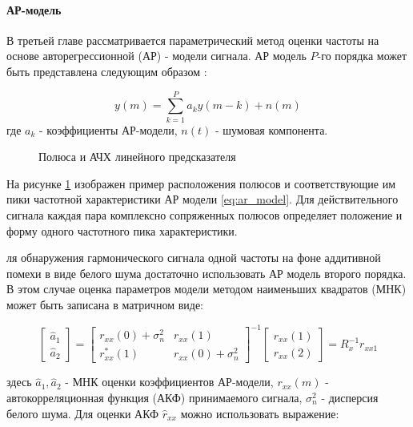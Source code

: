 \paragraph{АР-модель}

В третьей главе рассматривается параметрический метод оценки частоты на основе авторегрессионной (АР) - модели сигнала.
АР модель ${P}$-го порядка может быть представлена следующим образом \cite{marpl_book, saeed_book}:

\begin{equation}
	\label{eq:ar_model}
	y(m) = \sum \limits_{k=1}^{P} a_k y(m-k) + n(m)
\end{equation}
где ${a_k}$ - коэффициенты АР-модели, $n(t)$ - шумовая компонента.

\begin{figure}[H]
	\center{}
	\caption{Полюса и АЧХ линейного предсказателя}
	\label{pic:ar_poles}
\end{figure}

На рисунке \ref{pic:ar_poles} изображен пример расположения полюсов и соответствующие им пики частотной характеристики АР модели \ref{eq:ar_model}.
Для действительного сигнала каждая пара комплексно сопряженных полюсов определяет положение и форму одного частотного пика характеристики.

ля обнаружения гармонического сигнала одной частоты на фоне аддитивной помехи в виде белого шума достаточно использовать АР модель второго порядка.
В этом случае оценка параметров модели методом наименьших квадратов (МНК) может быть записана в матричном виде:

\begin{center}
\begin{equation}
	\label{eq:ar_coef_matrix}
	\left[ \begin{array}{c}
		\hat{a}_1 \\
		\hat{a}_2
	\end{array} \right]
	=
		\left[ \begin{array}{cc}
			r_{xx}(0)  + \sigma_n^2 & r_{xx}(1)\\
			r_{xx}^*(1) & r_{xx}(0) + \sigma_n^2 
		\end{array} \right]^{-1}
		\left[ \begin{array}{c}
			r_{xx}(1) \\
			r_{xx}(2)
		\end{array} \right]
	= R_x^{-1}r_{xx1}
\end{equation}
\end{center}
здесь ${\hat{a}_1, \hat{a}_2}$ - МНК оценки коэффициентов АР-модели, ${r_{xx}(m)}$ - автокорреляционная функция (АКФ) принимаемого сигнала,
${\sigma_n^2}$ - дисперсия белого шума.  Для оценки АКФ ${\hat{r}_{xx}}$ можно использовать выражение:

